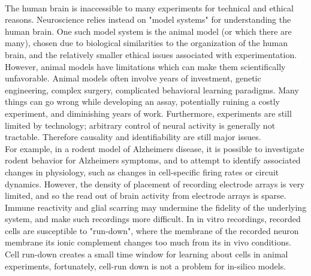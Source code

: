 \\
The human brain is inaccessible to many experiments for technical and ethical reasons.  Neuroscience relies instead on "model systems" for understanding the human brain.  One such model system is the animal model (or which there are many), chosen due to biological similarities to the organization of the human brain, and the relatively smaller ethical issues associated with experimentation.  However, animal models have limitations which can make them scientifically unfavorable. Animal models often involve years of investment, genetic engineering, complex surgery, complicated behavioral learning paradigms. Many things can go wrong while developing an assay, potentially ruining a costly experiment, and diminishing years of work.  Furthermore, experiments are still limited by technology; arbitrary control of neural activity is generally not tractable.  Therefore causality and identifiability are still major issues.
\\
For example, in a rodent model of Alzheimers disease, it is possible to investigate rodent behavior for Alzheimers symptoms, and to attempt to identify associated changes in physiology, such as changes in cell-specific firing rates or circuit dynamics.  However, the density of placement of recording electrode arrays is very limited, and so the read out of brain activity from electrode arrays is sparse. Immune reactivity and glial scarring may undermine the fidelity of the underlying system, and make such recordings more difficult.  In in vitro recordings, recorded cells are susceptible to "run-down", where the membrane of the recorded neuron membrane its ionic complement changes too much from its in vivo conditions. Cell run-down creates a small time window for learning about cells in animal experiments, fortunately, cell-run down is not a problem for in-silico models.

\\

